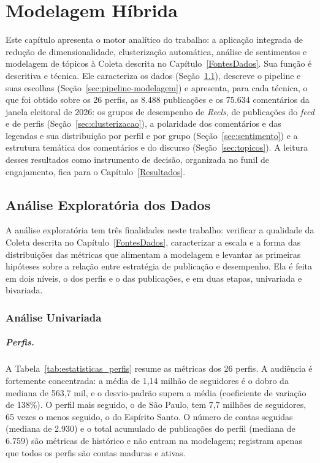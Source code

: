 \chapter{Modelagem Híbrida}\label{Desenvolvimento}

Este capítulo apresenta o motor analítico do trabalho: a aplicação integrada de redução de dimensionalidade, clusterização automática, análise de sentimentos e modelagem de tópicos à Coleta descrita no Capítulo~\ref{FontesDados}. Sua função é descritiva e técnica. Ele caracteriza os dados (Seção~\ref{sec:eda}), descreve o pipeline e suas escolhas (Seção~\ref{sec:pipeline-modelagem}) e apresenta, para cada técnica, o que foi obtido sobre os 26 perfis, as 8.488 publicações e os 75.634 comentários da janela eleitoral de 2026: os grupos de desempenho de \emph{Reels}, de publicações do \emph{feed} e de perfis (Seção~\ref{sec:clusterizacao}), a polaridade dos comentários e das legendas e sua distribuição por perfil e por grupo (Seção~\ref{sec:sentimento}) e a estrutura temática dos comentários e do discurso (Seção~\ref{sec:topicos}). A leitura desses resultados como instrumento de decisão, organizada no funil de engajamento, fica para o Capítulo~\ref{Resultados}.

\section{Análise Exploratória dos Dados}\label{sec:eda}

A análise exploratória tem três finalidades neste trabalho: verificar a qualidade da Coleta descrita no Capítulo~\ref{FontesDados}, caracterizar a escala e a forma das distribuições das métricas que alimentam a modelagem e levantar as primeiras hipóteses sobre a relação entre estratégia de publicação e desempenho. Ela é feita em dois níveis, o dos perfis e o das publicações, e em duas etapas, univariada e bivariada.

\subsection{Análise Univariada}

\paragraph*{Perfis.} A Tabela~\ref{tab:estatisticas_perfis} resume as métricas dos 26 perfis. A audiência é fortemente concentrada: a média de 1,14 milhão de seguidores é o dobro da mediana de 563,7 mil, e o desvio-padrão supera a média (coeficiente de variação de 138\%). O perfil mais seguido, o de São Paulo, tem 7,7 milhões de seguidores, 65 vezes o menos seguido, o do Espírito Santo. O número de contas seguidas (mediana de 2.930) e o total acumulado de publicações do perfil (mediana de 6.759) são métricas de histórico e não entram na modelagem; registram apenas que todos os perfis são contas maduras e ativas.

